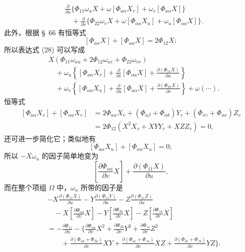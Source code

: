 \documentclass[11pt,a4paper,leqno]{article}
\begin{document}
\begin{equation}\tag{28}
\begin{aligned}
&\frac{\partial}{\partial u}\{\Phi_{11}\omega_uX
+\omega[\Phi_{a\alpha}X_v]+\omega_v[\Phi_{a\alpha}X]\}\\
&\quad+\frac{\partial}{\partial v}\{\Phi_{22}\omega_vX
+\omega[\Phi_{\alpha a}X_u]+\omega_u[\Phi_{\alpha a}X]\}.
\end{aligned}
\end{equation}
此外，根据 \S~66 有恒等式
\[
[\Phi_{a\alpha}X]+[\Phi_{\alpha a}X]=2\Phi_{12}X;
\]
所以表达式 (28) 可以写成
\[
\begin{aligned}
&X(\Phi_{11}\omega_{uu}+2\Phi_{12}\omega_{uv}
+\Phi_{22}\omega_{vv})\\
&\quad+\omega_u\left\{[\Phi_{a\alpha}X_v]
+\frac{\partial}{\partial v}[\Phi_{\alpha a}X]
+\frac{\partial(\Phi_{11}X)}{\partial u}\right\}\\
&\quad+\omega_v\left\{[\Phi_{\alpha a}X_u]
+\frac{\partial}{\partial u}[\Phi_{a\alpha}X]
+\frac{\partial(\Phi_{22}X)}{\partial v}\right\}
+\omega(\cdots).
\end{aligned}
\]
恒等式
\[
\begin{aligned}
[\Phi_{a\alpha}X_v]+[\Phi_{\alpha a}X_v]
&=2\Phi_{a\alpha}X_v+(\Phi_{a\beta}+\Phi_{\alpha b})Y_v
+(\Phi_{a\gamma}+\Phi_{\alpha c})Z_v\\
&=2\Phi_{12}(X^2X_v+XYY_v+XZZ_v)=0,
\end{aligned}
\]
还可进一步简化它；类似地有
\[
[\Phi_{a\alpha}X_u]+[\Phi_{\alpha a}X_u]=0;
\]
所以 $-X\omega_u$ 的因子简单地变为
\[
\left[\frac{\partial\Phi_{\alpha a}}{\partial v}X\right]
+\frac{\partial(\Phi_{11}X)}{\partial u},
\]
而在整个项组 $\Omega$ 中，$\omega_u$ 所带的因子是
\[
\begin{aligned}
&-X\frac{\partial(\Phi_{11}X)}{\partial u}
-Y\frac{\partial(\Phi_{11}Y)}{\partial u}
-Z\frac{\partial(\Phi_{11}Z)}{\partial u}\\
&\quad-X\left[\frac{\partial\Phi_{\alpha a}}{\partial v}X\right]
-Y\left[\frac{\partial\Phi_{\beta a}}{\partial v}X\right]
-Z\left[\frac{\partial\Phi_{\gamma a}}{\partial v}X\right]\\
&=-\frac{\partial\Phi_{11}}{\partial u}
-\Biggl\{\frac{\partial\Phi_{\alpha a}}{\partial v}X^2
+\frac{\partial\Phi_{\beta b}}{\partial v}Y^2
+\frac{\partial\Phi_{\gamma c}}{\partial v}Z^2\\
&\qquad+\frac{\partial(\Phi_{\alpha b}+\Phi_{\beta a})}{\partial v}XY
+\frac{\partial(\Phi_{\alpha c}+\Phi_{\gamma a})}{\partial v}XZ
+\frac{\partial(\Phi_{\beta c}+\Phi_{\gamma b})}{\partial v}YZ\Biggr\}.
\end{aligned}
\]
\end{document}
